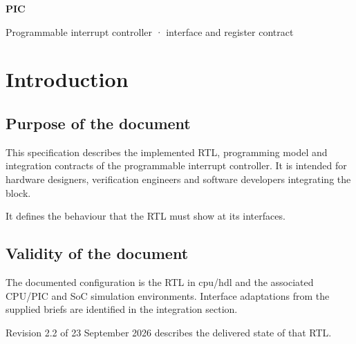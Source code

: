 \documentclass[11pt]{article}
\begin{document}
\begin{titlepage}\vspace*{24mm}
{\Huge\bfseries\color{accent}PIC\par}\vspace{4mm}{\LARGE Design Specification\par}\vspace{12mm}
{\Large Programmable interrupt controller · interface and register contract\par}\vfill
{}\end{titlepage}
\tableofcontents
\clearpage
\section{Introduction}

\subsection{Purpose of the document}
\noindent This specification describes the implemented RTL, programming model and integration contracts of the programmable interrupt controller. It is intended for hardware designers, verification engineers and software developers integrating the block.\par\medskip
\noindent It defines the behaviour that the RTL must show at its interfaces.\par\medskip

\subsection{Validity of the document}
\noindent The documented configuration is the RTL in cpu/hdl and the associated CPU/PIC and SoC simulation environments. Interface adaptations from the supplied briefs are identified in the integration section.\par\medskip
\noindent Revision 2.2 of 23 September 2026 describes the delivered state of that RTL.\par\medskip

\end{document}
